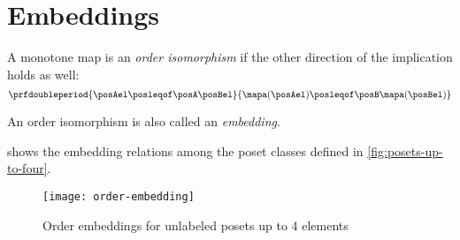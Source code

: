 \section{Embeddings}

\begin{ctdefinition}
    \label{def:order-isomorphism}
    A monotone map is an \emph{order isomorphism} if the other direction of the implication holds as well:
    \begin{equation}
        \prfdoubleperiod{
            \posAel \posleqof\posA \posBel
        }{
            \mapa(\posAel) \posleqof\posB \mapa(\posBel)
        }
    \end{equation}
\end{ctdefinition}

An order isomorphism is also called an \emph{embedding}.

 shows the embedding relations among the poset classes defined in \cref{fig:posets-up-to-four}.

\begin{figure*}
    \texttt{[image: order-embedding]}
    \caption{Order embeddings for unlabeled posets up to 4 elements}
    \label{fig:order-embedding}
\end{figure*}
